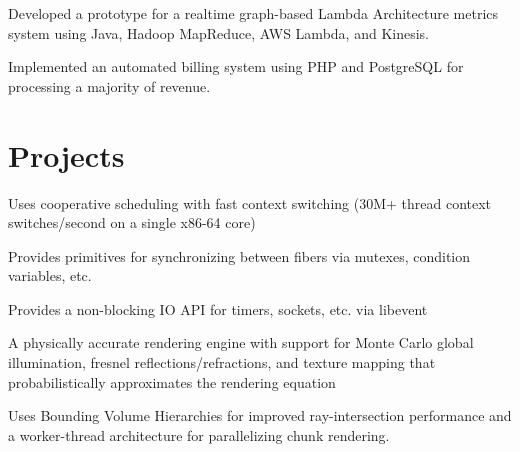 \documentclass[]{resume}
\begin{document}
\begin{minipage}[t]{0.66\textwidth}
\begin{tightemize}
\item Developed a prototype for a realtime graph-based Lambda Architecture metrics system using Java, Hadoop MapReduce, AWS Lambda, and Kinesis.
\item Implemented an automated billing system using PHP and PostgreSQL for processing a majority of revenue.
\end{tightemize}
\sectionsep


\section{Projects}

\begin{tightemize}
\item Uses cooperative scheduling with fast context switching (30M+ thread context switches/second on a single x86-64 core)
\item Provides primitives for synchronizing between fibers via mutexes, condition variables, etc.
\item Provides a non-blocking IO API for timers, sockets, etc. via libevent
\end{tightemize}
\sectionsep

\begin{tightemize}
\item A physically accurate rendering engine with support for Monte Carlo global illumination, fresnel reflections/refractions, and texture mapping that probabilistically approximates the rendering equation
\item Uses Bounding Volume Hierarchies for improved ray-intersection performance and a worker-thread architecture for parallelizing chunk rendering.
\end{tightemize}
\sectionsep

\end{minipage}
\end{document}
